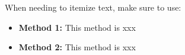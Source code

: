 When needing to itemize text, make sure to use:
\begin{itemize}
    \item \textbf{Method 1:}  This method is xxx
    \item \textbf{Method 2:}  This method is xxx
\end{itemize}

